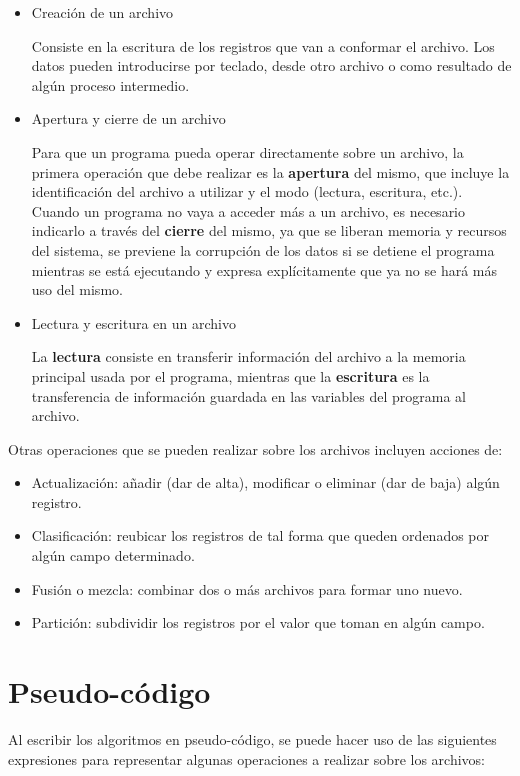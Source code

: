 \documentclass[
]{book}
\providecommand{\tightlist}{%
  \setlength{\itemsep}{0pt}\setlength{\parskip}{0pt}}
\begin{document}
\begin{itemize}
\item
  Creación de un archivo

  Consiste en la escritura de los registros que van a conformar el archivo. Los datos pueden introducirse por teclado, desde otro archivo o como resultado de algún proceso intermedio.
\item
  Apertura y cierre de un archivo

  Para que un programa pueda operar directamente sobre un archivo, la primera operación que debe realizar es la \textbf{apertura} del mismo, que incluye la identificación del archivo a utilizar y el modo (lectura, escritura, etc.). Cuando un programa no vaya a acceder más a un archivo, es necesario indicarlo a través del \textbf{cierre} del mismo, ya que se liberan memoria y recursos del sistema, se previene la corrupción de los datos si se detiene el programa mientras se está ejecutando y expresa explícitamente que ya no se hará más uso del mismo.
\item
  Lectura y escritura en un archivo

  La \textbf{lectura} consiste en transferir información del archivo a la memoria principal usada por el programa, mientras que la \textbf{escritura} es la transferencia de información guardada en las variables del programa al archivo.
\end{itemize}

Otras operaciones que se pueden realizar sobre los archivos incluyen acciones de:

\begin{itemize}
\tightlist
\item
  Actualización: añadir (dar de alta), modificar o eliminar (dar de baja) algún registro.
\item
  Clasificación: reubicar los registros de tal forma que queden ordenados por algún campo determinado.
\item
  Fusión o mezcla: combinar dos o más archivos para formar uno nuevo.
\item
  Partición: subdividir los registros por el valor que toman en algún campo.
\end{itemize}

\hypertarget{pseudo-cuxf3digo}{%
\section{Pseudo-código}\label{pseudo-cuxf3digo}}

Al escribir los algoritmos en pseudo-código, se puede hacer uso de las siguientes expresiones para representar algunas operaciones a realizar sobre los archivos:
\end{document}
